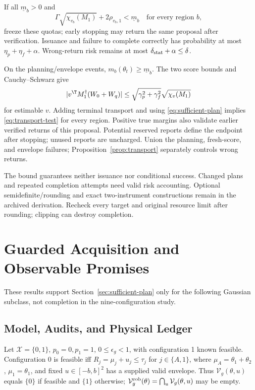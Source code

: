 \begin{proposition}
\label{prop:sufficient-plan}
If all $\underline m_b>0$ and
\begin{equation}
\Gamma\sqrt{\chi_{v_b}(M_1)}+2\rho_{v_b,1}<\underline m_b
\quad\text{for every region }b,
\label{eq:sufficient-plan}
\end{equation}
freeze these quotas; early stopping may return the same proposal after verification. Issuance and failure to complete correctly has probability at most $\eta_p+\eta_f+\alpha$. Wrong-return risk remains at most $\delta_{\rm stat}+\alpha\leq\delta$.
\end{proposition}
\begin{IEEEproof}
On the planning/envelope events, $m_b(\theta_t)\geq\underline m_b$. The two score bounds and Cauchy--Schwarz give
$$|v^\T M_1^\dagger(W_0+W_q)|
\leq\sqrt{\gamma_p^2+\gamma_f^2}\sqrt{\chi_v(M_1)}$$
for estimable $v$. Adding terminal transport and using \eqref{eq:sufficient-plan} implies \eqref{eq:transport-test} for every region. Positive true margins also validate earlier verified returns of this proposal. Potential reserved reports define the endpoint after stopping; unused reports are uncharged. Union the planning, fresh-score, and envelope failures; Proposition~\ref{prop:transport} separately controls wrong returns.
\end{IEEEproof}
The bound guarantees neither issuance nor conditional success. Changed plans and repeated completion attempts need valid risk accounting. Optional semidefinite/rounding and exact two-instrument constructions remain in the archived derivation. Recheck every target and original resource limit after rounding; clipping can destroy completion.

\section{Guarded Acquisition and Observable Promises}
\label{app:v37-acquisition}
These results support Section~\ref{sec:sufficient-plan} only for the following Gaussian subclass, not completion in the nine-configuration study.

\subsection{Model, Audits, and Physical Ledger}
Let $\mathcal X=\{0,1\}$, $p_0=0,p_1=1$, $0\leq\epsilon_g<1$, with configuration 1 known feasible. Configuration 0 is feasible iff $R_j=\mu_j+u_j\leq\tau_j$ for $j\in\{A,1\}$, where $\mu_A=\theta_1+\theta_2$, $\mu_1=\theta_1$, and fixed $u\in[-b,b]^2$ has a supplied valid envelope. Thus $\mathcal V_g(\theta,u)$ equals $\{0\}$ if feasible and $\{1\}$ otherwise; $\mathcal V_g^{\rm rob}(\theta)=\bigcap_u\mathcal V_g(\theta,u)$ may be empty.

